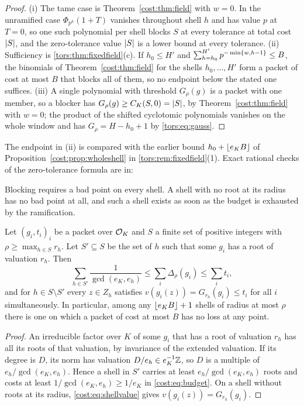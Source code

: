 \begin{proof}
(i) The tame case is Theorem~\ref{cost:thm:field} with $w=0$. In the unramified case
$\Phi_{p^h}(1+T)$ vanishes throughout shell $h$ and has value $p$ at $T=0$, so one such
polynomial per shell blocks $S$ at every tolerance at total cost $\lvert S\rvert$, and the
zero-tolerance value $\lvert S\rvert$ is a lower bound at every tolerance. (ii) Sufficiency is
\cref{tors:thm:fixedfield}\textup{(c)}. If $h_0\le H'$ and
$\sum_{h=h_0}^{H'}p^{-\min\{w,h-1\}}\le B$, the binomials of Theorem~\ref{cost:thm:field}
for the shells $h_0,\ldots,H'$ form a packet of cost at most $B$ that blocks all of them,
so no endpoint below the stated one suffices. (iii) A single polynomial with threshold
$G_\rho(g)$ is a packet with one member, so a blocker has $G_\rho(g)\ge C_K(S,0)=\lvert S\rvert$,
by Theorem~\ref{cost:thm:field} with $w=0$; the product of the shifted cyclotomic
polynomials vanishes on the whole window and has $G_\rho=H-h_0+1$ by
\eqref{tors:eq:gauss}.
\end{proof}

The endpoint in (ii) is compared with the earlier bound $h_0+\lfloor e_KB\rfloor$ of
Proposition~\ref{cost:prop:wholeshell} in \cref{tors:rem:fixedfield}(1). Exact rational
checks of the zero-tolerance formula are in:

Blocking requires a bad point on every shell. A shell with no root at its radius has no bad
point at all, and such a shell exists as soon as the budget is exhausted by the
ramification.

\begin{proposition}\label{cost:prop:wholeshell}
Let $(g_i,t_i)_i$ be a packet over $\mathcal{O}_K$ and $S$ a finite set of positive integers with
$\rho\ge\max_{h\in S}r_h$. Let $S'\subseteq S$ be the set of $h$ such that some $g_i$ has a
root of valuation $r_h$. Then
\[
 \sum_{h\in S'}\frac1{\gcd(e_K,e_h)}\le\sum_i\Delta_\rho(g_i)\le\sum_it_i,
\]
and for $h\in S\setminus S'$ every $z\in Z_h$ satisfies
$v(g_i(z))=G_{r_h}(g_i)\le t_i$ for all $i$ simultaneously. In particular, among any
$\lfloor e_KB\rfloor+1$ shells of radius at most $\rho$ there is one on which a packet of cost at
most $B$ has no loss at any point.
\end{proposition}

\begin{proof}
An irreducible factor over $K$ of some $g_i$ that has a root of valuation $r_h$ has all its
roots of that valuation, by invariance of the extended valuation. If its degree is $D$, its
norm has valuation $D/e_h\in e_K^{-1}\mathbb{Z}$, so $D$ is a multiple of $e_h/\gcd(e_K,e_h)$. Hence a
shell in $S'$ carries at least $e_h/\gcd(e_K,e_h)$ roots and costs at least
$1/\gcd(e_K,e_h)\ge1/e_K$ in \eqref{cost:eq:budget}. On a shell without roots at its radius,
\eqref{cost:eq:shellvalue} gives $v(g_i(z))=G_{r_h}(g_i)$.
\end{proof}

